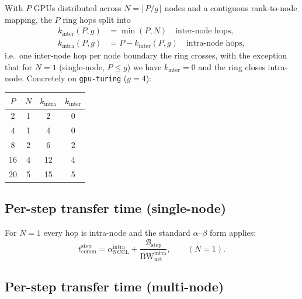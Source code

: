 \documentclass[11pt]{article}
\newcommand{\bw}{\mathrm{BW}}
\newcommand{\comm}{\mathrm{comm}}
\newcommand{\step}{\mathrm{step}}
\begin{document}
With $P$ GPUs distributed across $N = \lceil P/g \rceil$ nodes and a
contiguous rank-to-node mapping, the $P$ ring hops split into
\begin{align}
  k_\text{inter}(P, g) &= \min(P, N) \quad \text{inter-node hops}, \\
  k_\text{intra}(P, g) &= P - k_\text{inter}(P, g) \quad \text{intra-node hops},
  \label{eq:hop_count}
\end{align}
i.e.~one inter-node hop per node boundary the ring crosses, with the
exception that for $N = 1$ (single-node, $P \le g$) we have
$k_\text{inter} = 0$ and the ring closes intra-node. Concretely on
\texttt{gpu-turing} ($g = 4$):
\begin{center}
\begin{tabular}{@{}cccc@{}}
  \toprule
  $P$ & $N$ & $k_\text{intra}$ & $k_\text{inter}$ \\
  \midrule
  2  & 1 & 2  & 0 \\
  4  & 1 & 4  & 0 \\
  8  & 2 & 6  & 2 \\
  16 & 4 & 12 & 4 \\
  20 & 5 & 15 & 5 \\
  \bottomrule
\end{tabular}
\end{center}

\subsection{Per-step transfer time (single-node)}

For $N = 1$ every hop is intra-node and the standard $\alpha$--$\beta$
form applies:
\begin{equation}
    t_\comm^\step
    = \alpha_{\text{NCCL}}^{\text{intra}}
      + \frac{\mathcal{B}_\step}{\bw_{\text{net}}^{\text{intra}}} ,
    \qquad (N = 1).
  \label{eq:tcomm_step_intra}
\end{equation}

\subsection{Per-step transfer time (multi-node)}
\end{document}
